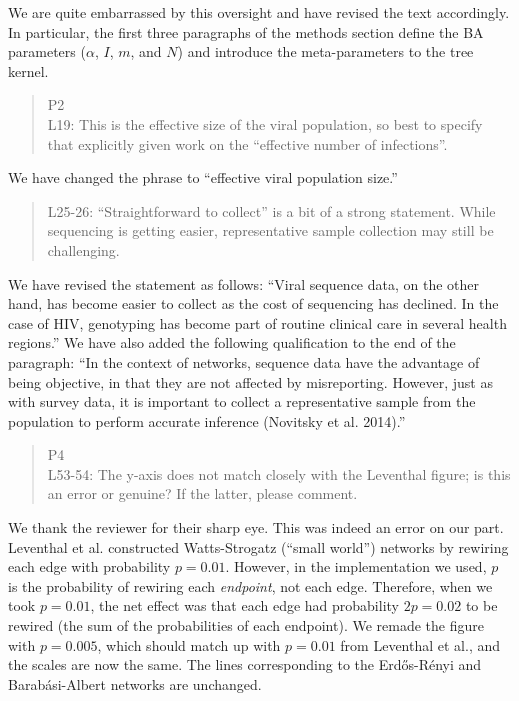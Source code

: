 \documentclass[12pt]{letter}
\begin{document}
\begin{letter}{ }
We are quite embarrassed by this oversight and have revised the text
accordingly. In particular, the first three paragraphs of the methods section
define the BA parameters ($\alpha$, $I$, $m$, and $N$) and introduce the
meta-parameters to the tree kernel.

\begin{quote}
  \itshape

  P2 \\
  L19: This is the effective size of the viral population, so best to specify
  that explicitly given work on the ``effective number of infections''.
\end{quote}

We have changed the phrase to ``effective viral population size.''

\begin{quote}
  \itshape

  L25-26: ``Straightforward to collect'' is a bit of a strong statement. While
  sequencing is getting easier, representative sample collection may still be
  challenging.
\end{quote}

We have revised the statement as follows: ``Viral sequence data, on the other
hand, has become easier to collect as the cost of sequencing has declined. In
the case of HIV, genotyping has become part of routine clinical care in several
health regions.'' We have also added the following qualification to the end of
the paragraph: ``In the context of networks, sequence data have the advantage
of being objective, in that they are not affected by misreporting. However,
just as with survey data, it is important to collect a representative sample
from the population to perform accurate inference (Novitsky et al. 2014).''

\begin{quote}
  \itshape

  P4\\
  L53-54: The y-axis does not match closely with the Leventhal figure; is this
  an error or genuine? If the latter, please comment.
\end{quote}

We thank the reviewer for their sharp eye. This was indeed an error on our
part. Leventhal et al. constructed Watts-Strogatz (``small world'') networks by
rewiring each edge with probability $p = 0.01$. However, in the implementation
we used, $p$ is the probability of rewiring each \emph{endpoint}, not each
edge. Therefore, when we took $p = 0.01$, the net effect was that each edge had
probability $2p = 0.02$ to be rewired (the sum of the probabilities of each
endpoint). We remade the figure with $p = 0.005$, which should match up with $p
= 0.01$ from Leventhal et al., and the scales are now the same. The lines
corresponding to the Erd\H{o}s-R\'enyi and Barab\'asi-Albert networks are
unchanged.


\end{letter}
\end{document}

